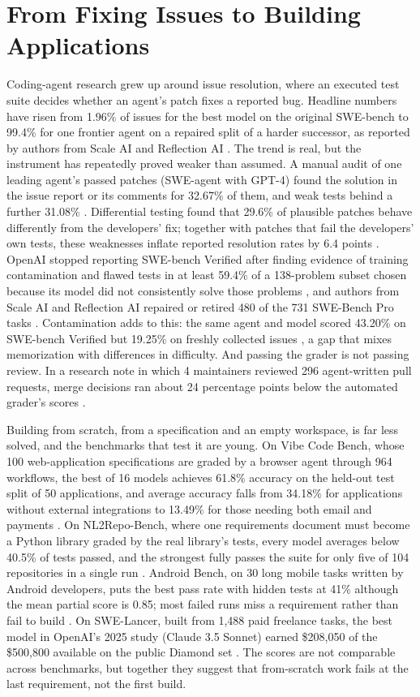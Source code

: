\section{From Fixing Issues to Building Applications}\label{sec:building}

Coding-agent research grew up around issue resolution, where an executed test suite decides whether an agent's patch fixes a reported bug. Headline numbers have risen from 1.96\% of issues for the best model on the original SWE-bench \citep{C1} to 99.4\% for one frontier agent on a repaired split of a harder successor, as reported by authors from Scale AI and Reflection AI \citep{C12}. The trend is real, but the instrument has repeatedly proved weaker than assumed. A manual audit of one leading agent's passed patches (SWE-agent with GPT-4) found the solution in the issue report or its comments for 32.67\% of them, and weak tests behind a further 31.08\% \citep{C5}. Differential testing found that 29.6\% of plausible patches behave differently from the developers' fix; together with patches that fail the developers' own tests, these weaknesses inflate reported resolution rates by 6.4 points \citep{V12}. OpenAI stopped reporting SWE-bench Verified after finding evidence of training contamination and flawed tests in at least 59.4\% of a 138-problem subset chosen because its model did not consistently solve those problems \citep{C15}, and authors from Scale AI and Reflection AI repaired or retired 480 of the 731 SWE-Bench Pro tasks \citep{C12}. Contamination adds to this: the same agent and model scored 43.20\% on SWE-bench Verified but 19.25\% on freshly collected issues \citep{C17}, a gap that mixes memorization with differences in difficulty. And passing the grader is not passing review. In a research note in which 4 maintainers reviewed 296 agent-written pull requests, merge decisions ran about 24 percentage points below the automated grader's scores \citep{C14}.

Building from scratch, from a specification and an empty workspace, is far less solved, and the benchmarks that test it are young. On Vibe Code Bench, whose 100 web-application specifications are graded by a browser agent through 964 workflows, the best of 16 models achieves 61.8\% accuracy on the held-out test split of 50 applications, and average accuracy falls from 34.18\% for applications without external integrations to 13.49\% for those needing both email and payments \citep{C19}. On NL2Repo-Bench, where one requirements document must become a Python library graded by the real library's tests, every model averages below 40.5\% of tests passed, and the strongest fully passes the suite for only five of 104 repositories in a single run \citep{C22}. Android Bench, on 30 long mobile tasks written by Android developers, puts the best pass rate with hidden tests at 41\% although the mean partial score is 0.85; most failed runs miss a requirement rather than fail to build \citep{C29}. On SWE-Lancer, built from 1,488 paid freelance tasks, the best model in OpenAI's 2025 study (Claude 3.5 Sonnet) earned \$208,050 of the \$500,800 available on the public Diamond set \citep{C16}. The scores are not comparable across benchmarks, but together they suggest that from-scratch work fails at the last requirement, not the first build.

